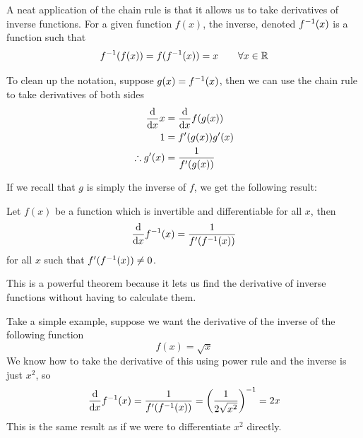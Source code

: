 A neat application of the chain rule is that it allows us to take derivatives of inverse functions. For a given function $f(x)$, the inverse, denoted ${f}^{-1}(x)$ is a function such that
\[ {f}^{-1}(f(x)) = f({f}^{-1}(x)) = x \qquad \forall x \in \mathbb{R} \]

To clean up the notation, suppose $g(x) = {f}^{-1}(x)$, then we can use the chain rule to take derivatives of both sides
\begin{align*}
	\dv{x} x &= \dv{x} f(g(x)) \\
	1 &= f'(g(x)) g'(x) \\
	\therefore g'(x) &= \frac{1}{f'(g(x))} 
\end{align*}

\newpage 
If we recall that $g$ is simply the inverse of $f$, we get the following result:
\begin{theorem}
	Let $f(x)$ be a function which is invertible and differentiable for all $x$, then
	\[ \dv{x} \inv f(x) = \frac{1}{f'(\inv f(x))} \]
	for all $x$ such that $f'({f}^{-1}(x)) \neq 0$.
\end{theorem}

This is a powerful theorem because it lets us find the derivative of inverse functions without having to calculate them.

\begin{example}
	Take a simple example, suppose we want the derivative of the inverse of the following function
	\[ f(x) = \sqrt{x} \]
	We know how to take the derivative of this using power rule and the inverse is just $x^2$, so
	\[ \dv{x} \inv f(x) = \frac{1}{f'(\inv f(x))} = \qty(\frac{1}{2\sqrt{x^2}})^{-1} = 2x \]
	This is the same result as if we were to differentiate $x^2$ directly.
\end{example}

